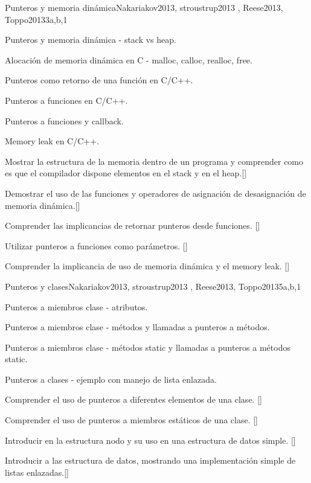 \begin{syllabus}
\begin{unit}{Punteros y memoria dinámica}{}{Nakariakov2013, stroustrup2013 , Reese2013, Toppo2013}{3}{a,b,1}
\begin{topics}
	\item Punteros y memoria dinámica - stack vs heap.
	\item Alocación de memoria dinámica en C - malloc, calloc, realloc, free.
	\item Punteros como retorno de una función en C/C++.
	\item Punteros a funciones en C/C++.
	\item Punteros a funciones y callback.
	\item Memory leak en C/C++.
\end{topics}

\begin{learningoutcomes}
	\item Mostrar la estructura de la memoria dentro de un programa y comprender como es que el compilador dispone elementos en el stack y en el heap.[\Usage]
	\item Demostrar el uso de las funciones y operadores de asignación de desasignación de memoria dinámica.[\Usage]
	\item Comprender las implicancias de retornar punteros desde funciones. [\Usage]
	\item Utilizar punteros a funciones como parámetros. [\Usage]
	\item Comprender la implicancia de uso de memoria dinámica y el memory leak. [\Usage]
\end{learningoutcomes}
\end{unit}

\begin{unit}{Punteros y clases}{}{Nakariakov2013, stroustrup2013 , Reese2013, Toppo2013}{5}{a,b,1}
\begin{topics}
	\item Punteros a miembros clase - atributos.
	\item Punteros a miembros clase - métodos y llamadas a punteros a métodos.
	\item Punteros a miembros clase - métodos static y llamadas a punteros a métodos static.
	\item Punteros a clases - ejemplo con manejo de lista enlazada.
\end{topics}

\begin{learningoutcomes}
	\item Comprender el uso de punteros a diferentes elementos de una clase. [\Usage]
	\item Comprender el uso de punteros a miembros estáticos de una clase. [\Usage]
	\item Introducir en la estructura nodo y su uso en una estructura de datos simple. [\Usage]
	\item Introducir a las estructura de datos, mostrando una implementación simple de listas enlazadas.[\Usage]
\end{learningoutcomes}
\end{unit}


\end{syllabus}
